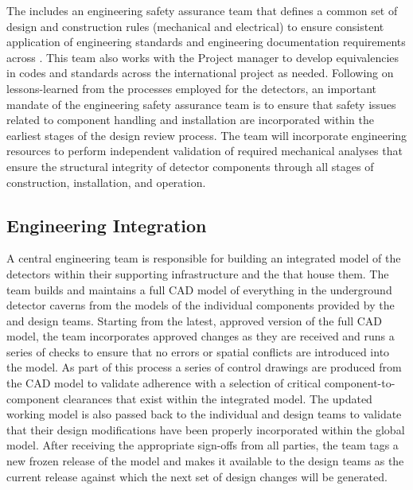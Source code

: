 The  includes an engineering safety assurance team that
defines a common set of design and construction rules (mechanical and
electrical) to ensure consistent application of engineering standards
and engineering documentation requirements across .
This team also works with the Project  manager to develop
equivalencies in codes and standards across the international project
as needed.  Following on lessons-learned from the processes employed
for the  detectors, an important mandate of the
engineering safety assurance team is to ensure that safety issues
related to component handling and installation are incorporated within
the earliest stages of the design review process.  The 
team will incorporate engineering resources to perform independent
validation of required mechanical analyses that ensure the structural
integrity of detector components through all stages of construction,
installation, and operation.

\subsection{Engineering Integration}
\label{sec:dune_engineering}

A central  engineering team is responsible for building 
an integrated model of the detectors within their supporting
infrastructure and the  that house them.  The team 
builds and maintains a full \threed CAD model  
of everything in 
the underground detector caverns from the models of the individual
components provided by the  and  design 
teams.  Starting from the latest, approved version of the full CAD 
model, the  team incorporates approved changes as they 
are received and runs a series of checks to ensure that no errors 
or spatial conflicts are introduced into the model.  As part of 
this process a series of \twod control drawings are produced from 
the \threed CAD model to validate adherence with a selection of 
critical component-to-component clearances that exist within the 
integrated model.  The updated working model is also passed back 
to the individual  and  design teams 
to validate that their design modifications have been properly 
incorporated within the global model.  After receiving the
appropriate sign-offs from all parties, the  team tags 
a new frozen release of the model and makes it available to the 
design teams as the current release against which the next set 
of design changes will be generated.

